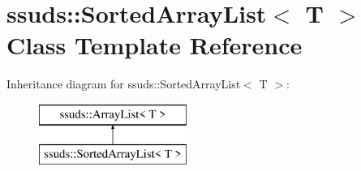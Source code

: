 \hypertarget{classssuds_1_1_sorted_array_list}{}\section{ssuds\+::Sorted\+Array\+List$<$ T $>$ Class Template Reference}
\label{classssuds_1_1_sorted_array_list}
Inheritance diagram for ssuds\+::Sorted\+Array\+List$<$ T $>$\+:\begin{figure}[H]
\begin{center}
\leavevmode
\includegraphics[height=2.000000cm]{classssuds_1_1_sorted_array_list}
\end{center}
\end{figure}
